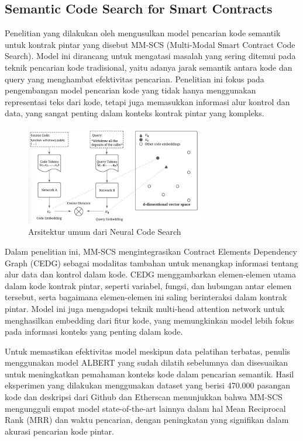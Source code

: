 \subsection{Semantic Code Search for Smart Contracts}
\label{subsec:semantic-code-search}

Penelitian yang dilakukan oleh \cite{shi2021semantic} mengusulkan model pencarian kode semantik untuk kontrak pintar yang disebut MM-SCS (Multi-Modal Smart Contract Code Search). Model ini dirancang untuk mengatasi masalah yang sering ditemui pada teknik pencarian kode tradisional, yaitu adanya jarak semantik antara kode dan query yang menghambat efektivitas pencarian. Penelitian ini fokus pada pengembangan model pencarian kode yang tidak hanya menggunakan representasi teks dari kode, tetapi juga memasukkan informasi alur kontrol dan data, yang sangat penting dalam konteks kontrak pintar yang kompleks.

\begin{figure}[ht]
  \centering
  \includegraphics[width=0.7\textwidth]{resources/chapter-2/architecture-code-search.png}
  \caption{Arsitektur umum dari Neural Code Search \parencite{shi2021semantic}}
  \label{image:architecture-code-search}
\end{figure}

Dalam penelitian ini, MM-SCS mengintegrasikan Contract Elements Dependency Graph (CEDG) sebagai modalitas tambahan untuk menangkap informasi tentang alur data dan kontrol dalam kode. CEDG menggambarkan elemen-elemen utama dalam kode kontrak pintar, seperti variabel, fungsi, dan hubungan antar elemen tersebut, serta bagaimana elemen-elemen ini saling berinteraksi dalam kontrak pintar. Model ini juga mengadopsi teknik multi-head attention network untuk menghasilkan embedding dari fitur kode, yang memungkinkan model lebih fokus pada informasi konteks yang penting dalam kode.

Untuk memastikan efektivitas model meskipun data pelatihan terbatas, penulis menggunakan model ALBERT yang sudah dilatih sebelumnya dan disesuaikan untuk meningkatkan pemahaman konteks kode dalam pencarian semantik. Hasil eksperimen yang dilakukan menggunakan dataset yang berisi 470.000 pasangan kode dan deskripsi dari Github dan Etherscan menunjukkan bahwa MM-SCS mengungguli empat model state-of-the-art lainnya dalam hal Mean Reciprocal Rank (MRR) dan waktu pencarian, dengan peningkatan yang signifikan dalam akurasi pencarian kode pintar.

